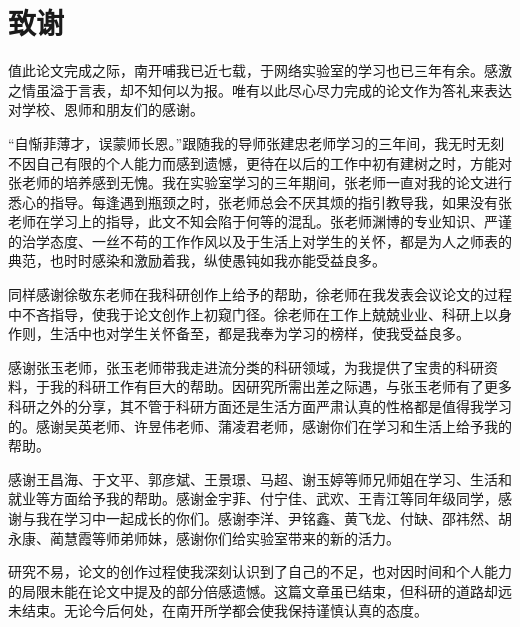 
\chapter*{致谢}

值此论文完成之际，南开哺我已近七载，于网络实验室的学习也已三年有余。感激之情虽溢于言表，却不知何以为报。唯有以此尽心尽力完成的论文作为答礼来表达对学校、恩师和朋友们的感谢。

“自惭菲薄才，误蒙师长恩。”跟随我的导师张建忠老师学习的三年间，我无时无刻不因自己有限的个人能力而感到遗憾，更待在以后的工作中初有建树之时，方能对张老师的培养感到无愧。我在实验室学习的三年期间，张老师一直对我的论文进行悉心的指导。每逢遇到瓶颈之时，张老师总会不厌其烦的指引教导我，如果没有张老师在学习上的指导，此文不知会陷于何等的混乱。张老师渊博的专业知识、严谨的治学态度、一丝不苟的工作作风以及于生活上对学生的关怀，都是为人之师表的典范，也时时感染和激励着我，纵使愚钝如我亦能受益良多。

同样感谢徐敬东老师在我科研创作上给予的帮助，徐老师在我发表会议论文的过程中不吝指导，使我于论文创作上初窥门径。徐老师在工作上兢兢业业、科研上以身作则，生活中也对学生关怀备至，都是我奉为学习的榜样，使我受益良多。

感谢张玉老师，张玉老师带我走进流分类的科研领域，为我提供了宝贵的科研资料，于我的科研工作有巨大的帮助。因研究所需出差之际遇，与张玉老师有了更多科研之外的分享，其不管于科研方面还是生活方面严肃认真的性格都是值得我学习的。感谢吴英老师、许昱伟老师、蒲凌君老师，感谢你们在学习和生活上给予我的帮助。

感谢王昌海、于文平、郭彦斌、王景璟、马超、谢玉婷等师兄师姐在学习、生活和就业等方面给予我的帮助。感谢金宇菲、付宁佳、武欢、王青江等同年级同学，感谢与我在学习中一起成长的你们。感谢李洋、尹铭鑫、黄飞龙、付缺、邵祎然、胡永康、蔺慧霞等师弟师妹，感谢你们给实验室带来的新的活力。

研究不易，论文的创作过程使我深刻认识到了自己的不足，也对因时间和个人能力的局限未能在论文中提及的部分倍感遗憾。这篇文章虽已结束，但科研的道路却远未结束。无论今后何处，在南开所学都会使我保持谨慎认真的态度。
